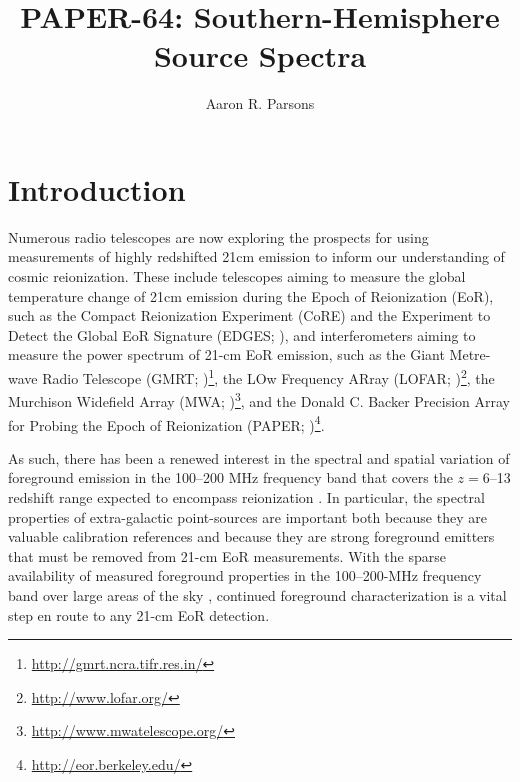 \documentclass[preprint]{aastex}
\begin{document}
\title{PAPER-64: Southern-Hemisphere Source Spectra}

\author{Aaron R. Parsons}

\begin{abstract}
\end{abstract}

\section{Introduction}

Numerous radio telescopes are now exploring the prospects for
using measurements of highly redshifted 21cm emission to inform our understanding
of cosmic reionization. 
These include telescopes aiming to measure the global temperature change of 
21cm emission during the Epoch of Reionization (EoR), such as
the Compact Reionization Experiment (CoRE) and
the Experiment to Detect the Global EoR Signature (EDGES; \citealt{bowman_rogers2010}),
and interferometers aiming to measure the power spectrum of 21-cm EoR emission, such as
the Giant Metre-wave Radio Telescope (GMRT;
\citealt{pen_et_al2009})\footnote{\url{http://gmrt.ncra.tifr.res.in/}},
the LOw Frequency ARray (LOFAR; \citealt{rottgering_et_al2006})\footnote{\url{http://www.lofar.org/}},
the Murchison Widefield Array (MWA; \citealt{lonsdale_et_al2009})\footnote{\url{http://www.mwatelescope.org/}}, 
and 
the Donald C. Backer Precision Array for Probing the Epoch of Reionization (PAPER;
\citealt{parsons_et_al2010})\footnote{\url{http://eor.berkeley.edu/}}.

As such, there has been a renewed interest in the spectral and spatial variation of 
foreground emission in the 100--200 MHz frequency band that covers
the $z=6$--13 redshift range expected to encompass reionization
\citep{furlanetto_et_al2006}.
In particular, the spectral properties of extra-galactic point-sources are important
both because they are valuable calibration references
and because they are strong foreground emitters that must be removed from 21-cm EoR measurements.
With the sparse availability of measured foreground properties in the
100--200-MHz frequency band over large areas of the sky \citep{deolivieracosta_et_al2008}, continued 
foreground characterization is a
vital step en route to any 21-cm EoR detection.

\end{document}
